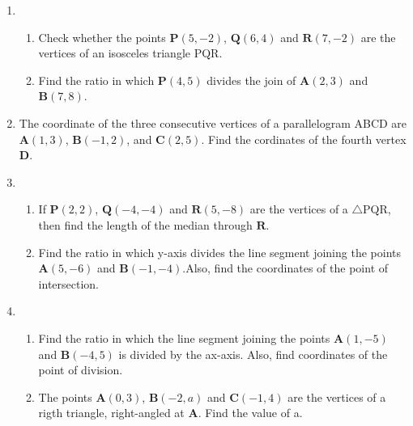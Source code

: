 \documentclass{article}
\let\vec\mathbf
\begin{document}
\begin{enumerate}
\begin{enumerate}[label=(\roman*)]
\end{enumerate}
\item \begin{enumerate}[label=(\alph*)]
		\item Check whether the points $\vec{P}(5, -2)$, $\vec{Q}(6, 4)$ and $\vec{R}(7, -2)$ are the vertices of an isosceles triangle PQR.
		\item Find the ratio in which $\vec{P}(4, 5)$ divides the join of $\vec{A}(2, 3)$ and $\vec{B}(7, 8)$.
\end{enumerate}
\item The coordinate of the three consecutive vertices of a parallelogram ABCD are $\vec{A}(1, 3)$, $\vec{B}(-1, 2)$, and $\vec{C}(2, 5)$. Find the cordinates of the fourth vertex $\vec{D}$.

\item \begin{enumerate}[label=(\alph*)]
		\item If $\vec{P}(2, 2)$, $\vec{Q}(-4, -4)$ and $\vec{R}(5, -8)$ are the vertices of a $\triangle$PQR, then find the length of the median through $\vec{R}$.
		\item Find the ratio in which y-axis divides the line segment joining the points $\vec{A}(5, -6)$ and $\vec{B}(-1, -4)$.Also, find the coordinates of the point of intersection.
\end{enumerate}
\item
	\begin{enumerate}[label=(\alph*)]
		\item Find the ratio in which the line segment joining the points $\vec{A}(1, -5)$ and $\vec{B}(-4, 5)$ is divided by the ax-axis. Also, find coordinates of the point of division.
		\item The points $\vec{A}(0, 3)$, $\vec{B}(-2, a)$ and $\vec{C}(-1, 4)$ are the vertices of a rigth triangle, right-angled at $\vec{A}$. Find the value of a. 
	\end{enumerate}
\end{enumerate}
\end{document}
